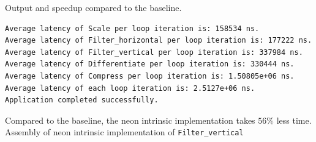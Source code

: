\documentclass[
  course = {{ESE532 System-on-a-Chip}},
  quartile = {{}},
  assignment = 4,
  name = {{Sheil Sarda, Kate Ballard}},
  studentnumber = {{}},
  email = {{sheils@seas.upenn.edu, kballard@seas.upenn.edu}},
  firstexercise = 1
]{aga-homework}
\begin{document}
\exercise
\subexercise

Output and speedup compared to the baseline.
\begin{verbatim}
Average latency of Scale per loop iteration is: 158534 ns.
Average latency of Filter_horizontal per loop iteration is: 177222 ns.
Average latency of Filter_vertical per loop iteration is: 337984 ns.
Average latency of Differentiate per loop iteration is: 330444 ns.
Average latency of Compress per loop iteration is: 1.50805e+06 ns.
Average latency of each loop iteration is: 2.5127e+06 ns.
Application completed successfully.
\end{verbatim}

Compared to the baseline, the neon intrinsic implementation takes $56\%$ less time. \\

Assembly of neon intrinsic implementation of \verb|Filter_vertical|
\end{document}
